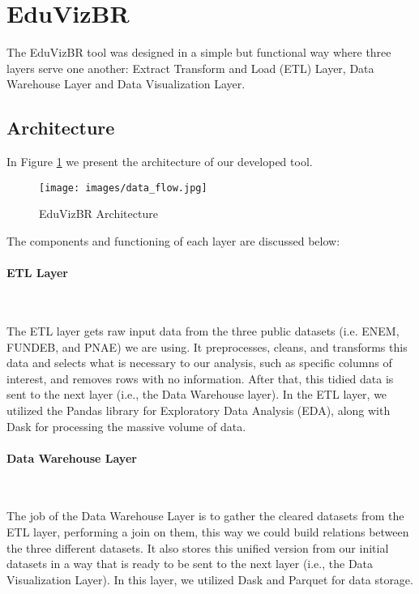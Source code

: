 \documentclass[12pt]{article}
\begin{document}
\section{EduVizBR} 

The EduVizBR tool was designed in a simple but functional way where three layers serve one another: Extract Transform and Load (ETL) Layer, Data Warehouse Layer and Data Visualization Layer. 


\subsection{Architecture}

In Figure \ref{data_flow} we present the architecture of our developed tool.

\begin{figure}[h!] 
\centering
\texttt{[image: images/data\_flow.jpg]}
\caption{EduVizBR Architecture} 
\label{data_flow}
\end{figure}

The components and functioning of each layer are discussed below:


\paragraph{ETL Layer}\

The ETL layer gets raw input data from the three public datasets (i.e. ENEM, FUNDEB, and PNAE) we are using. It preprocesses, cleans, and transforms this data and selects what is necessary to our analysis, such as specific columns of interest, and removes rows with no information. After that, this tidied data is sent to the next layer (i.e., the Data Warehouse layer). In the ETL layer, we utilized the Pandas library for Exploratory Data Analysis (EDA), along with Dask for processing the massive volume of data.

\paragraph{Data Warehouse Layer}\

The job of the Data Warehouse Layer is to gather the cleared datasets from the ETL layer, performing a join on them, this way we could build relations between the three different datasets.  It also stores this unified version from our initial datasets in a way that is ready to be sent to the next layer (i.e., the Data Visualization Layer). In this layer, we utilized Dask and Parquet for data storage.
\end{document}
